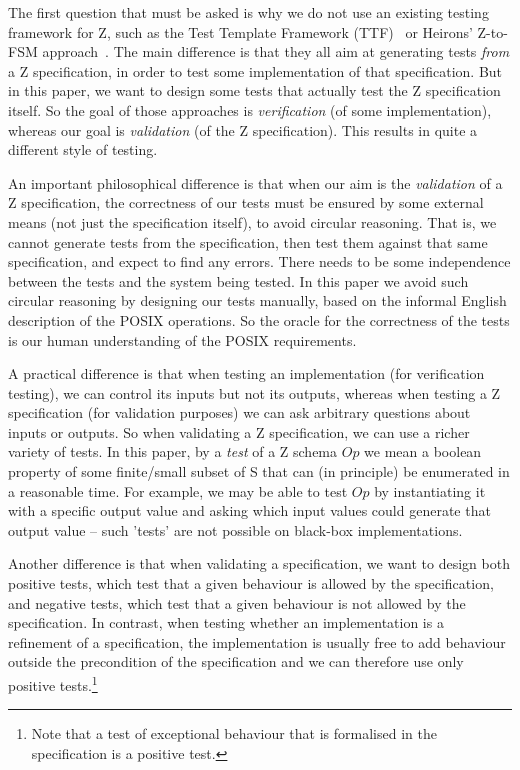 \documentclass{llncs}
\begin{document}
The first question that must be asked is why we do not use an existing
testing framework for Z, such as the Test Template Framework
(TTF)~\cite{Stocks93,carrington94} or Heirons' Z-to-FSM
approach~\cite{hierons97}.  The main difference is that they all aim at
generating tests \emph{from} a Z specification, in order to test some
implementation of that specification.  But in this paper, we want to design
some tests that actually test the Z specification itself.  So the goal of
those approaches is \emph{verification} (of some implementation), whereas
our goal is \emph{validation} (of the Z specification).  This results in
quite a different style of testing.

An important philosophical difference is that when our aim is the
\emph{validation} of a Z specification, the correctness of our tests
must be ensured by some external means (not just the specification
itself), to avoid circular reasoning.  That is, we cannot generate
tests from the specification, then test them against that same
specification, and expect to find any errors.  There needs to be some
independence between the tests and the system being tested.  In this
paper we avoid such circular reasoning by designing our tests
manually, based on the informal English description of the POSIX
operations.  So the oracle for the correctness of the tests is our
human understanding of the POSIX requirements.

A practical difference is that when testing an implementation (for
verification testing), we can control its inputs but not its outputs,
whereas when testing a Z specification (for validation purposes) we
can ask arbitrary questions about inputs or outputs.  So when
validating a Z specification, we can use a richer variety of tests.
In this paper, by a \emph{test} of a Z schema $Op$ we mean a boolean
property of some finite/small subset of S that can (in principle) be
enumerated in a reasonable time.  For example, we may be able to test
$Op$ by instantiating it with a specific output value and asking which
input values could generate that output value -- such 'tests' are not
possible on black-box implementations.

Another difference is that when validating a specification, we
want to design both positive tests, which test that a given behaviour
is allowed by the specification, and negative tests, which test that a
given behaviour is not allowed by the specification.  In contrast,
when testing whether an implementation is a refinement of a
specification, the implementation is usually free to add behaviour
outside the precondition of the specification and we can therefore use
only positive tests.\footnote{Note that a test of exceptional
  behaviour that is formalised in the specification is a positive test.}
\end{document}
